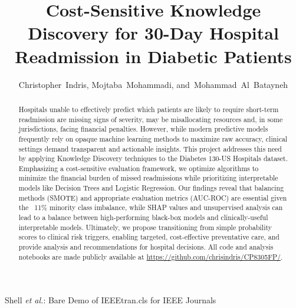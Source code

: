 \documentclass[journal,onecolumn]{IEEEtran}
\begin{document}
\title{Cost-Sensitive Knowledge Discovery for 30-Day Hospital Readmission in Diabetic Patients}

\author{Christopher~Indris,
        Mojtaba~Mohammadi,
        and~Mohammad~Al~Batayneh%
}


%
{Shell \MakeLowercase{\textit{et al.}}: Bare Demo of IEEEtran.cls for IEEE Journals}

\maketitle

\begin{abstract}
Hospitals unable to effectively predict which patients are likely to require short-term readmission are missing signs of severity, may be misallocating resources and, in some jurisdictions, facing financial penalties. However, while modern predictive models frequently rely on opaque machine learning methods to maximize raw accuracy, clinical settings demand transparent and actionable insights. This project addresses this need by applying Knowledge Discovery techniques to the Diabetes 130-US Hospitals dataset. Emphasizing a cost-sensitive evaluation framework, we optimize algorithms to minimize the financial burden of missed readmissions while prioritizing interpretable models like Decision Trees and Logistic Regression. Our findings reveal that balancing methods (SMOTE) and appropriate evaluation metrics (AUC-ROC) are essential given the ~11\% minority class imbalance, while SHAP values and unsupervised analysis can lead to a balance between high-performing black-box models and clinically-useful interpretable models. Ultimately, we propose transitioning from simple probability scores to clinical risk triggers, enabling targeted, cost-effective preventative care, and provide analysis and recommendations for hospital decisions. All code and analysis notebooks are made publicly available at \href{https://github.com/chrisindris/CP8305FP/}{https://github.com/chrisindris/CP8305FP/}.
\end{abstract}
\end{document}
